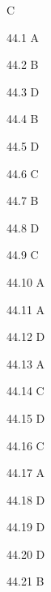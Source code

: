 \begin{Solution}{44}
C
\end{Solution}
\begin{Solution}{44.{1}}
A
\end{Solution}
\begin{Solution}{44.{2}}
B
\end{Solution}
\begin{Solution}{44.{3}}
D
\end{Solution}
\begin{Solution}{44.{4}}
B
\end{Solution}
\begin{Solution}{44.{5}}
D
\end{Solution}
\begin{Solution}{44.{6}}
C
\end{Solution}
\begin{Solution}{44.{7}}
B
\end{Solution}
\begin{Solution}{44.{8}}
D
\end{Solution}
\begin{Solution}{44.{9}}
C
\end{Solution}
\begin{Solution}{44.{10}}
A
\end{Solution}
\begin{Solution}{44.{11}}
A
\end{Solution}
\begin{Solution}{44.{12}}
D
\end{Solution}
\begin{Solution}{44.{13}}
A
\end{Solution}
\begin{Solution}{44.{14}}
C
\end{Solution}
\begin{Solution}{44.{15}}
D
\end{Solution}
\begin{Solution}{44.{16}}
C
\end{Solution}
\begin{Solution}{44.{17}}
A
\end{Solution}
\begin{Solution}{44.{18}}
D
\end{Solution}
\begin{Solution}{44.{19}}
D
\end{Solution}
\begin{Solution}{44.{20}}
D
\end{Solution}
\begin{Solution}{44.{21}}
B
\end{Solution}
